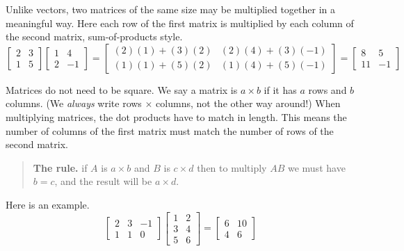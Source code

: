 \documentclass[11pt,oneside]{amsbook}
\theoremstyle{definition}
\theoremstyle{plain}
\theoremstyle{definition}
\theoremstyle{remark}
\numberwithin{equation}{section}
\numberwithin{figure}{section}
\begin{document}
Unlike vectors, two matrices of the same size may be multiplied together in a meaningful way. Here each row of the first matrix is multiplied by each column of the second matrix, sum-of-products style.
\[\begin{bmatrix}2&3\\1&5\end{bmatrix}
  \begin{bmatrix}1&4\\2&-1\end{bmatrix}
  =\begin{bmatrix}(2)(1)+(3)(2)&(2)(4)+(3)(-1)\\(1)(1)+(5)(2)&(1)(4)+(5)(-1)\end{bmatrix}
  =\begin{bmatrix}8&5\\11&-1\end{bmatrix}
\]

Matrices do not need to be square. We say a matrix is $a\times b$ if it has $a$ rows and $b$ columns. (We \emph{always} write rows $\times$ columns, not the other way around!) When multiplying matrices, the dot products have to match in length. This means the number of columns of the first matrix must match the number of rows of the second matrix.
\begin{quotation}
  \textbf{The rule.} if $A$ is $a\times b$ and $B$ is $c\times d$ then to multiply $AB$ we must have $b=c$, and the result will be $a\times d$.
\end{quotation}
Here is an example.
\[\begin{bmatrix}2&3&-1\\1&1&0\end{bmatrix}
  \begin{bmatrix}1&2\\3&4\\5&6\end{bmatrix}
  =\begin{bmatrix}6&10\\4&6\end{bmatrix}
\]
\end{document}
